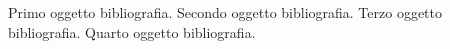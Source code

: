 \documentclass[12pt,a4paper,openright,twoside]{report}
\begin{document}
\begin{thebibliography}{90}             %
\rhead[\fancyplain{}{\bfseries \leftmark}]{\fancyplain{}{\bfseries
\thepage}}
 Primo oggetto bibliografia.
 Secondo oggetto bibliografia.
 Terzo oggetto bibliografia.
 Quarto oggetto bibliografia.
\end{thebibliography}
\end{document}
